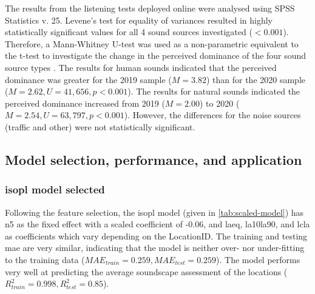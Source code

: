    \begin{figure}
     \caption{\label{fig:wordclouds}}
   \end{figure}

   The results from the listening tests deployed online were analysed using SPSS Statistics v. 25. Levene's test for equality of variances resulted in highly statistically significant values for all 4 sound sources investigated ($<0.001$). Therefore, a Mann-Whitney U-test was used as a non-parametric equivalent to the t-test to investigate the change in the perceived dominance of the four sound source types \citep{McKnight2010Mann}. The results for human sounds indicated that the perceived dominance was greater for the 2019 sample ($M=3.82$) than for the 2020 sample ($M=2.62, U=41,656, p<0.001$). The results for natural sounds indicated the perceived dominance increased from 2019 ($M=2.00$) to 2020 ($M=2.54, U=63,797, p<0.001$). However, the differences for the noise sources (traffic and other) were not statistically significant.

   \begin{figure}
     \caption{\label{tab:source-dominance-stats}}
   \end{figure}

 \subsection{Model selection, performance, and application}

   \subsubsection{\gls{isopl} model selected}

   Following the feature selection, the \gls{isopl} model (given in \cref{tab:scaled-model}) has \gls{n5} as the fixed effect with a scaled coefficient of -0.06, and \gls{laeq}, \gls{la10la90}, and \gls{lcla} as coefficients which vary depending on the LocationID. The training and testing \gls{mae} are very similar, indicating that the model is neither over- nor under-fitting to the training data ($MAE_{train}=0.259, MAE_{test}=0.259$). The model performs very well at predicting the average soundscape assessment of the locations ($R^2_{train}=0.998, R^2_{test}=0.85$).

